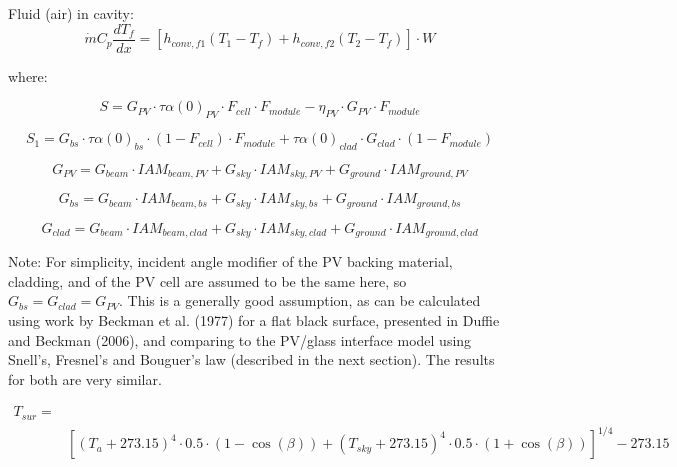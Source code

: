 Fluid (air) in cavity:
\begin{equation}
\dot{m}C_{p}\frac{dT_{f}}{dx}=\left[h_{conv,f1}\left(T_{1}-T_{f}\right)+h_{conv,f2}\left(T_{2}-T_{f}\right)\right]\cdot {W}
\label{eq:BIPVT-cavity-air}
\end{equation}

where:

\begin{equation}
S=G_{PV}\cdot\tau\alpha (0)_{PV}\cdot F_{cell}\cdot F_{module}-\eta_{PV}\cdot G_{PV}\cdot F_{module}
\label{eq:BIPVT-S}
\end{equation}

\begin{equation}
S_{1}=G_{bs}\cdot\tau\alpha (0)_{bs}\cdot \left(1-F_{cell}\right)\cdot F_{module}+\tau\alpha (0)_{clad}\cdot G_{clad}\cdot \left(1-F_{module}\right)
\label{eq:BIPVT-S1}
\end{equation}

\begin{equation}
G_{PV}=G_{beam}\cdot IAM_{beam,PV}+G_{sky}\cdot IAM_{sky,PV}+G_{ground}\cdot IAM_{ground,PV}
\label{eq:BIPVT-G-PV}
\end{equation}

\begin{equation}
G_{bs}=G_{beam}\cdot IAM_{beam,bs}+G_{sky}\cdot IAM_{sky,bs}+G_{ground}\cdot IAM_{ground,bs}
\label{eq:BIPVT-G-bs}
\end{equation}

\begin{equation}
G_{clad}=G_{beam}\cdot IAM_{beam,clad}+G_{sky}\cdot IAM_{sky,clad}+G_{ground}\cdot IAM_{ground,clad}
\label{eq:BIPVT-G-clad}
\end{equation}

Note: For simplicity, incident angle modifier of the PV backing material, cladding, and of the PV cell are assumed to be the same here, so \(G_{bs} = G_{clad} = G_{PV}\). This is a generally good assumption, as can be calculated using work by Beckman et al. (1977) for a flat black surface, presented in Duffie and Beckman (2006), and comparing to the PV/glass interface model using Snell's, Fresnel's and Bouguer's law (described in the next section). The results for both are very similar.

\begin{equation}
\begin{split}
T_{sur}=\\ &\left[\left(T_{a}+273.15\right)^{4}\cdot 0.5 \cdot \left(1-\cos\left(\beta \right)\right)+\left(T_{sky}+273.15\right)^{4}\cdot 0.5 \cdot \left(1+\cos\left(\beta \right)\right)\right]^{1/4} - 273.15
\end{split}
\label{eq:BIPVT-T-sur}
\end{equation}

